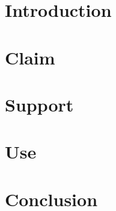 
%
%
%
%
\section{Introduction}
\label{s:intro}
%
%
%
%
\section{Claim}
\label{s:claim}
%
%
%
%
\section{Support}
\label{s:support}
%
%
%
%
\section{Use}
\label{s:use}
%
%
%
%
\section{Conclusion}
\label{s:concl}
%
%
%
%
